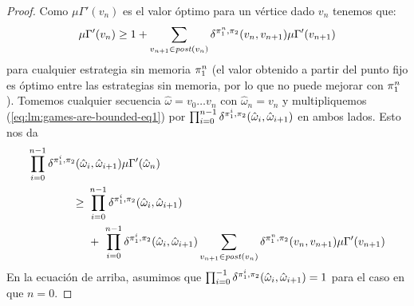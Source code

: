 \begin{proof}
  Como $\mu \Gamma'(v_n)$ es el valor óptimo para un vértice dado $v_{n}$ tenemos que:
  \begin{equation}\label{eq:lm:games-are-bounded-eq1}
    \mu \Gamma'(v_n) \geq 1 + \sum_{v_{n+1} \in \mathit{post}(v_n)} \delta^{\pi_{1}^n, \pi_{2}}(v_n, v_{n+1}) \mu \Gamma'(v_{n+1})
  \end{equation}
  para cualquier estrategia sin memoria $\pi_{1}^n$ (el valor obtenido a partir del punto fijo es
  óptimo entre las estrategias sin memoria, por lo que no puede mejorar con  $\pi_{1}^n$).
  Tomemos cualquier secuencia $\hat{\omega} = v_0 \dots v_n$ con
  $\hat{\omega}_n = v_n$ y multipliquemos
  (\ref{eq:lm:games-are-bounded-eq1}) por
  $\prod^{n-1}_{i=0} \delta^{\pi_{1}^i, \pi_{2}}(\hat{\omega}_i, \hat{\omega}_{i+1})$
  en ambos lados. Esto nos da
  \begin{align}
    \prod^{n-1}_{i=0} \delta^{\strat{1}^i, \strat{2}}(\hat{\omega}_i, \hat{\omega}_{i+1}) \mu \Gamma'(\hat{\omega}_n)  \hspace{-6.5em}& \notag\\
    \geq \ & \prod^{n-1}_{i=0} \delta^{\strat{1}^i, \strat{2}}(\hat{\omega}_i, \hat{\omega}_{i+1}) \label{eq:lm:games-are-bounded-eq2} \\
    & + \ \prod^{n-1}_{i=0} \delta^{\strat{1}^i, \strat{2}}(\hat{\omega}_i, \hat{\omega}_{i+1})\sum_{v_{n+1} \in \post(v_n)} \delta^{\strat{1}^n, \strat{2}}(v_n, v_{n+1}) \mu \Gamma'(v_{n+1}) \notag
  \end{align}
  En la ecuación de arriba, asumimos que
  $\prod^{-1}_{i=0} \delta^{\pi_{1}^i, \pi_{2}}(\hat{\omega}_i, \hat{\omega}_{i+1}) = 1$
  para el caso en que $n=0$.
  

\end{proof}

